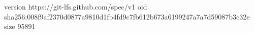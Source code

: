version https://git-lfs.github.com/spec/v1
oid sha256:008f9af2370d0877a9810d1fb4fd9c7fb612b673a6199247a7a7d59087b3c32e
size 95891

